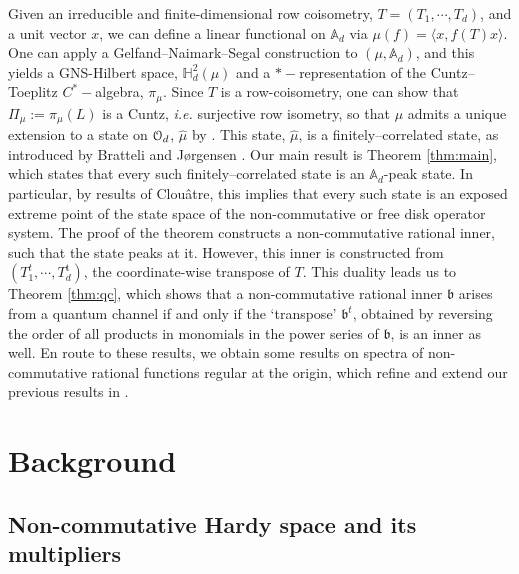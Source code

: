 \documentclass{article}
\theoremstyle{definition}
\theoremstyle{remark}
\numberwithin{equation}{section}
\def\fb{\mathfrak{b}}
\def\A{\mathbb{A} _d}
\def\mrt{\mathrm{t}}
\def\hardy{\mathbb{H} ^2 _d}
\begin{document}
Given an irreducible and finite-dimensional row coisometry, $T = (T_1 , \cdots , T_d )$, and a unit vector $x$, we can define a linear functional on $\A$ via $\mu(f) = \langle x, f(T) x \rangle$. One can apply a Gelfand--Naimark--Segal construction to $(\mu , \A )$, and this yields a GNS-Hilbert space, $\hardy (\mu )$ and a $*-$representation of the Cuntz--Toeplitz $C^*-$algebra, $\pi _\mu$. Since $T$ is a row-coisometry, one can show that $\Pi _\mu := \pi _\mu (L)$ is a Cuntz, \emph{i.e.} surjective row isometry, so that $\mu$ admits a unique extension to a state on ${\mathcal O}_d$, $\hat{\mu}$ by \cite[Proposition 5.11]{JMT-ncFnM}. This state, $\hat{\mu}$, is a finitely--correlated state, as introduced by Bratteli and J\o rgensen \cite{BraJorg}. Our main result is Theorem \ref{thm:main}, which states that every such finitely--correlated state is an $\A$-peak state. In particular, by results of Clou\^atre, this implies that every such state is an exposed extreme point of the state space of the non-commutative or free disk operator system. The proof of the theorem constructs a non-commutative rational inner, such that the state peaks at it. However, this inner is constructed from $(T^t _1 , \cdots, T^\mrt _d )$, the coordinate-wise transpose of $T$. This duality leads us to Theorem \ref{thm:qc}, which shows that a non-commutative rational inner $\fb$ arises from a quantum channel if and only if the `transpose' $\fb^t$, obtained by reversing the order of all products in monomials in the power series of $\fb$, is an inner as well. En route to these results, we obtain some results on spectra of non-commutative rational functions regular at the origin, which refine and extend our previous results in \cite{JMS-ncratClark}.


\section{Background} \label{sec:background}

\subsection{Non-commutative Hardy space and its multipliers} \label{subsec:hardy}
\end{document}
